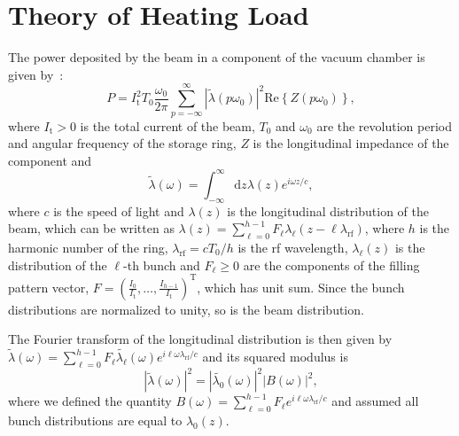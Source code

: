 \documentclass
[
    a4paper,
]{jacow}
\providecommand{\der}{\mathrm{d}}
\providecommand{\rf}{\mathrm{rf}}
\providecommand{\Real}[1]{\ensuremath{\mathrm{Re}\left\{#1\right\}}}
\begin{document}
\section{Theory of Heating Load}
    The power deposited by the beam in a component of the vacuum chamber is given by~\cite{Chao:1993zn}:
    \begin{equation}\label{eq:power_general}
        P = I_\mathrm{t}^2T_0 \frac{\omega_0}{2\pi}\sum_{p=-\infty}^{\infty} \left|\tilde{\lambda}(p\omega_0)\right|^2\Real{Z(p\omega_0)},
    \end{equation}
    where $I_\mathrm{t}>0$ is the total current of the beam, $T_0$ and $\omega_0$ are the revolution period and angular frequency of the storage ring, $Z$ is the longitudinal impedance of the component and 
    \begin{equation}
        \tilde{\lambda}(\omega) = \int_{-\infty}^\infty\der z \lambda(z) e^{i\omega z/c},
    \end{equation}
    where $c$ is the speed of light and $\lambda(z)$ is the longitudinal distribution of the beam, which can be written as
    $
        \lambda(z) = \sum_{\ell=0}^{h-1} F_\ell \lambda_\ell(z - \ell \lambda_\rf)
    $,
    where $h$ is the harmonic number of the ring, $\lambda_\rf=cT_0/h$ is the rf wavelength, $\lambda_\ell(z)$ is the distribution of the $\ell$-th bunch and $F_\ell \ge 0$ are the components of the filling pattern vector,
    $
    F = \left(\frac{I_0}{I_\mathrm{t}},\dots, \frac{I_{h-1}}{I_\mathrm{t}}\right)^\mathrm{T}
    $,
    which has unit sum. Since the bunch distributions are normalized to unity, so is the beam distribution.
    
    The Fourier transform of the longitudinal distribution is then given by
    $
        \tilde{\lambda}(\omega) = \sum_{\ell=0}^{h-1}F_\ell\tilde{\lambda_\ell}(\omega)e^{i\ell\omega \lambda_\rf/c}
    $
    and its squared modulus is
    \begin{equation}\label{eq:modulus_squared}
        \left|\tilde{\lambda}(\omega)\right|^2 = \left|\tilde{\lambda_0}(\omega)\right|^2 \left|B(\omega)\right|^2,
    \end{equation}
    where we defined the quantity $B(\omega) = \sum_{\ell=0}^{h-1}F_\ell e^{i\ell\omega \lambda_\rf/c}$
    and assumed all bunch distributions are equal to $\lambda_0(z)$.
\end{document}

